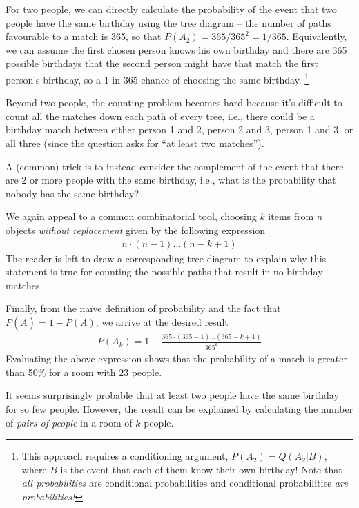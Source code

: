 For two people, 
we can directly calculate the probability of the event
that two people have the same birthday using the tree diagram 
-- the number of paths favourable to a match is 365, 
so that \(P\left( A_{2} \right) = 365/365^{2} = 1/365\). 
Equivalently,
we can assume the first chosen person knows his own birthday 
and there are 365 possible birthdays that the second person might have that match the first person's birthday, 
so a 1 in 365 chance of choosing the same birthday.%
\footnote{%
This approach requires a conditioning argument, 
\(P\left( A_{2} \right) = Q(A_{2}|B)\), 
where \(B\) is the event that each of them know their own birthday! 
Note that \emph{all probabilities} are conditional 
probabilities and conditional probabilities \emph{are probabilities!}}

Beyond two people, 
the counting problem becomes hard because it's difficult to count all the 
matches down each path of every tree, i.e.,
there could be a birthday match between either person 1 and 2, 
person 2 and 3, 
person 1 and 3, 
or all three (since the question asks for ``at least two matches'').

A (common) trick is to instead consider the complement of the event
that there are 2 or more people with the same birthday, i.e., 
what is the probability that nobody has the same birthday?

We again appeal to a common combinatorial tool, 
choosing \(k\) items from \(n\) objects \emph{without replacement} 
given by the following expression
\begin{align}
n \cdot (n - 1)\ldots(n - k + 1)
\end{align}
The reader is left to draw a corresponding tree diagram to explain why
this statement is true for counting the possible paths that result in no
birthday matches.

Finally, 
from the naïve definition of probability and the fact that
\(P\left( \overline{A} \right) = 1 - P(A)\), we arrive at the desired result
\begin{align}
P\left( A_{k} \right) = 1 - \frac{365\cdot(365 - 1)\ldots(365 - k + 1)}{365^{k}}
\end{align}
Evaluating the above expression shows that the probability of a match is
greater than 50\% for a room with 23 people. 

It seems surprisingly probable that at least two people have the same birthday for so few people. 
However, 
the result can be explained by calculating the 
number of \emph{pairs of people} in a room of \(k\) people. 

